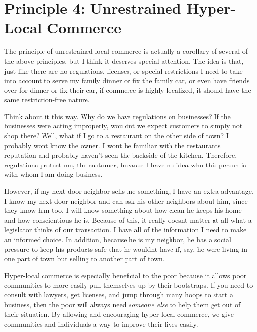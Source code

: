 \documentclass[letterpaper]{article}
\begin{document}
\section{Principle 4: Unrestrained Hyper-Local Commerce}
{\color{black}
The principle of unrestrained local commerce is actually a corollary of
several of the above principles, but I think it deserves special
attention. The idea is that, just like there are no regulations,
licenses, or special restrictions I need to take into account to serve
my family dinner or fix the family car, or even have friends over for
dinner or fix their car, if commerce is highly localized, it should
have the same restriction-free nature.}

{\color{black}
Think about it this way. Why do we have regulations on businesses?  If
the businesses were acting improperly, wouldn{\textquotesingle}t we
expect customers to simply not shop there?  Well,
\textcolor[rgb]{0.32941177,0.5529412,0.83137256}{what }if I go to a
restaurant on the other side of town? I probably won{\textquotesingle}t
know the owner. I won{\textquotesingle}t be familiar with the
restaurant{\textquotesingle}s reputation and probably haven’t seen the
backside of the kitchen. Therefore, regulations protect me, the
customer, because I have no idea who this person is with whom I am
doing business.}

{\color{black}
However, if my next-door neighbor sells me something, I have an extra
advantage. I know my next-door neighbor and can ask his other neighbors
about him, since they know him too. I will know something about how
clean he keeps his home and how conscientious he is. Because of this,
it really doesn{\textquotesingle}t matter at all what a legislator
thinks of our transaction. I have all of the information I need to make
an informed choice. In addition, because he is my neighbor, he has a
social pressure to keep his products safe that he
wouldn{\textquotesingle}t have if, say, he were living in one part of
town but selling to another part of town.}

{\color{black}
\textcolor[rgb]{0.32941177,0.5529412,0.83137256}{Hyper-local commerce}
is especially beneficial to the poor because it allows poor communities
to more easily pull themselves up by their bootstraps. If you need to
consult with lawyers, get licenses, and jump through many hoops to
start a business, then the poor will always need \textit{someone else}
to help them get out of their situation. By allowing and encouraging
hyper-local commerce, we give communities and individuals a way to
improve their lives easily.}
\end{document}
